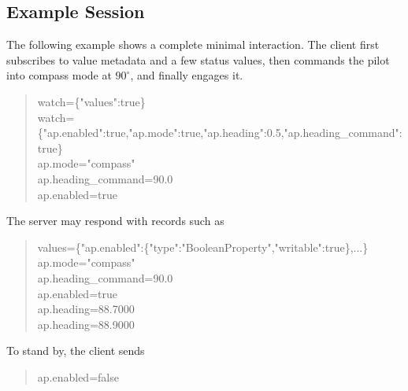 \documentclass[11pt,twocolumn]{article}
\begin{document}
\subsection{Example Session}
The following example shows a complete minimal interaction.  The client
first subscribes to value metadata and a few status values, then commands
the pilot into compass mode at \(90^\circ\), and finally engages it.
\begin{quote}
\scriptsize\ttfamily
watch=\{"values":true\}\\
watch=\{"ap.enabled":true,"ap.mode":true,\allowbreak"ap.heading":0.5,\allowbreak"ap.heading\_command":true\}\\
ap.mode="compass"\\
ap.heading\_command=90.0\\
ap.enabled=true
\end{quote}
The server may respond with records such as
\begin{quote}
\scriptsize\ttfamily
values=\{"ap.enabled":\{"type":"BooleanProperty",\allowbreak"writable":true\},...\}\\
ap.mode="compass"\\
ap.heading\_command=90.0\\
ap.enabled=true\\
ap.heading=88.7000\\
ap.heading=88.9000
\end{quote}
To stand by, the client sends
\begin{quote}
\ttfamily
ap.enabled=false
\end{quote}
\end{document}
